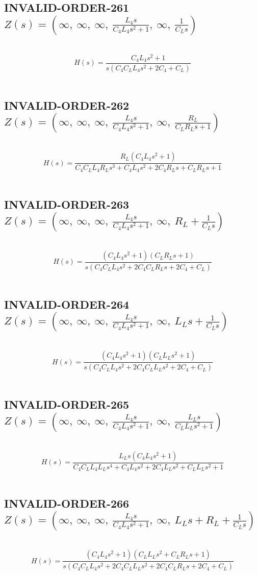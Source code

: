 \documentclass{article}
\begin{document}
\subsection{INVALID-ORDER-261 $Z(s) = \left( \infty, \  \infty, \  \infty, \  \frac{L_{4} s}{C_{4} L_{4} s^{2} + 1}, \  \infty, \  \frac{1}{C_{L} s}\right)$ } \ 
\textbf{\[H(s) = \frac{C_{4} L_{4} s^{2} + 1}{s \left(C_{4} C_{L} L_{4} s^{2} + 2 C_{4} + C_{L}\right)}\] } \ 
\subsection{INVALID-ORDER-262 $Z(s) = \left( \infty, \  \infty, \  \infty, \  \frac{L_{4} s}{C_{4} L_{4} s^{2} + 1}, \  \infty, \  \frac{R_{L}}{C_{L} R_{L} s + 1}\right)$ } \ 
\textbf{\[H(s) = \frac{R_{L} \left(C_{4} L_{4} s^{2} + 1\right)}{C_{4} C_{L} L_{4} R_{L} s^{3} + C_{4} L_{4} s^{2} + 2 C_{4} R_{L} s + C_{L} R_{L} s + 1}\] } \ 
\subsection{INVALID-ORDER-263 $Z(s) = \left( \infty, \  \infty, \  \infty, \  \frac{L_{4} s}{C_{4} L_{4} s^{2} + 1}, \  \infty, \  R_{L} + \frac{1}{C_{L} s}\right)$ } \ 
\textbf{\[H(s) = \frac{\left(C_{4} L_{4} s^{2} + 1\right) \left(C_{L} R_{L} s + 1\right)}{s \left(C_{4} C_{L} L_{4} s^{2} + 2 C_{4} C_{L} R_{L} s + 2 C_{4} + C_{L}\right)}\] } \ 
\subsection{INVALID-ORDER-264 $Z(s) = \left( \infty, \  \infty, \  \infty, \  \frac{L_{4} s}{C_{4} L_{4} s^{2} + 1}, \  \infty, \  L_{L} s + \frac{1}{C_{L} s}\right)$ } \ 
\textbf{\[H(s) = \frac{\left(C_{4} L_{4} s^{2} + 1\right) \left(C_{L} L_{L} s^{2} + 1\right)}{s \left(C_{4} C_{L} L_{4} s^{2} + 2 C_{4} C_{L} L_{L} s^{2} + 2 C_{4} + C_{L}\right)}\] } \ 
\subsection{INVALID-ORDER-265 $Z(s) = \left( \infty, \  \infty, \  \infty, \  \frac{L_{4} s}{C_{4} L_{4} s^{2} + 1}, \  \infty, \  \frac{L_{L} s}{C_{L} L_{L} s^{2} + 1}\right)$ } \ 
\textbf{\[H(s) = \frac{L_{L} s \left(C_{4} L_{4} s^{2} + 1\right)}{C_{4} C_{L} L_{4} L_{L} s^{4} + C_{4} L_{4} s^{2} + 2 C_{4} L_{L} s^{2} + C_{L} L_{L} s^{2} + 1}\] } \ 
\subsection{INVALID-ORDER-266 $Z(s) = \left( \infty, \  \infty, \  \infty, \  \frac{L_{4} s}{C_{4} L_{4} s^{2} + 1}, \  \infty, \  L_{L} s + R_{L} + \frac{1}{C_{L} s}\right)$ } \ 
\textbf{\[H(s) = \frac{\left(C_{4} L_{4} s^{2} + 1\right) \left(C_{L} L_{L} s^{2} + C_{L} R_{L} s + 1\right)}{s \left(C_{4} C_{L} L_{4} s^{2} + 2 C_{4} C_{L} L_{L} s^{2} + 2 C_{4} C_{L} R_{L} s + 2 C_{4} + C_{L}\right)}\] } \ 
\end{document}
